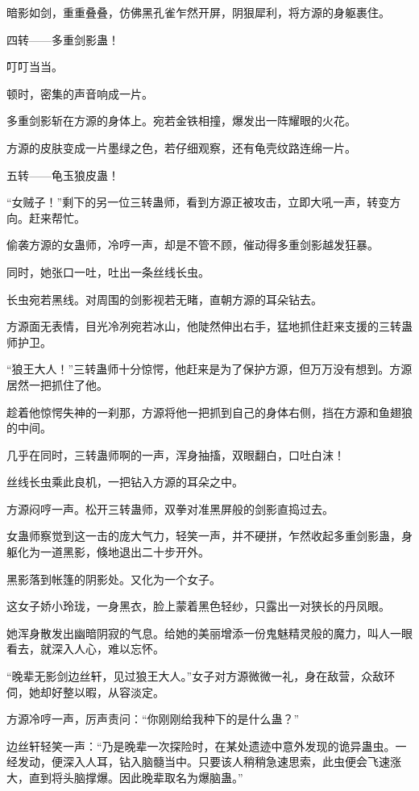 \begin{this_body}
暗影如剑，重重叠叠，仿佛黑孔雀乍然开屏，阴狠犀利，将方源的身躯裹住。

四转——多重剑影蛊！

叮叮当当。

顿时，密集的声音响成一片。

多重剑影斩在方源的身体上。宛若金铁相撞，爆发出一阵耀眼的火花。

方源的皮肤变成一片墨绿之色，若仔细观察，还有龟壳纹路连绵一片。

五转——龟玉狼皮蛊！

“女贼子！”剩下的另一位三转蛊师，看到方源正被攻击，立即大吼一声，转变方向。赶来帮忙。

偷袭方源的女蛊师，冷哼一声，却是不管不顾，催动得多重剑影越发狂暴。

同时，她张口一吐，吐出一条丝线长虫。

长虫宛若黑线。对周围的剑影视若无睹，直朝方源的耳朵钻去。

方源面无表情，目光冷冽宛若冰山，他陡然伸出右手，猛地抓住赶来支援的三转蛊师护卫。

“狼王大人！”三转蛊师十分惊愕，他赶来是为了保护方源，但万万没有想到。方源居然一把抓住了他。

趁着他惊愕失神的一刹那，方源将他一把抓到自己的身体右侧，挡在方源和鱼翅狼的中间。

几乎在同时，三转蛊师啊的一声，浑身抽搐，双眼翻白，口吐白沫！

丝线长虫乘此良机，一把钻入方源的耳朵之中。

方源闷哼一声。松开三转蛊师，双拳对准黑屏般的剑影直捣过去。

女蛊师察觉到这一击的庞大气力，轻笑一声，并不硬拼，乍然收起多重剑影蛊，身躯化为一道黑影，倏地退出二十步开外。

黑影落到帐篷的阴影处。又化为一个女子。

这女子娇小玲珑，一身黑衣，脸上蒙着黑色轻纱，只露出一对狭长的丹凤眼。

她浑身散发出幽暗阴寂的气息。给她的美丽增添一份鬼魅精灵般的魔力，叫人一眼看去，就深入人心，难以忘怀。

“晚辈无影剑边丝轩，见过狼王大人。”女子对方源微微一礼，身在敌营，众敌环伺，她却好整以暇，从容淡定。

方源冷哼一声，厉声责问：“你刚刚给我种下的是什么蛊？”

边丝轩轻笑一声：“乃是晚辈一次探险时，在某处遗迹中意外发现的诡异蛊虫。一经发动，便深入人耳，钻入脑髓当中。只要该人稍稍急速思索，此虫便会飞速涨大，直到将头脑撑爆。因此晚辈取名为爆脑蛊。”


\end{this_body}
